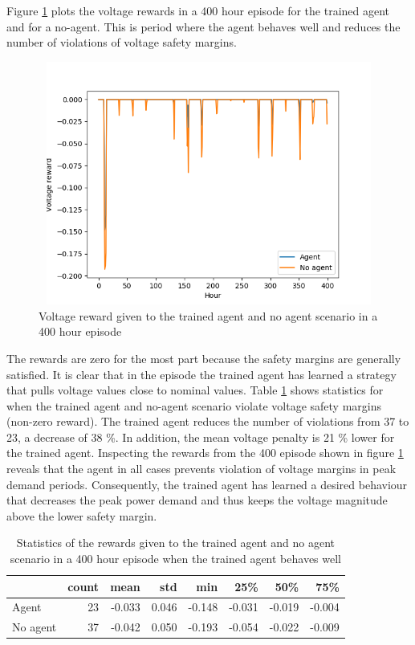 \documentclass[class=book, crop=false]{standalone}
\begin{document}
Figure \ref{fig:results:config1_400hour_good_voltage} plots the voltage rewards in a 400 hour episode for the trained agent and for a no-agent. This is period where the agent behaves well and reduces the number of violations of voltage safety margins. 

\begin{figure}[H]
    \center
\includegraphics[height=8cm, width=12cm]{figures/config1_400hour_good_voltage.png}
    \caption[size = 9]{Voltage reward given to the trained agent and no agent scenario in a 400 hour episode}
    \label{fig:results:config1_400hour_good_voltage}
\end{figure}



The rewards are zero for the most part because the safety margins are generally satisfied. It is clear that in the episode the trained agent has learned a strategy that pulls voltage values close to nominal values. Table \ref{table:results:config1_400hour_good_voltage} shows statistics for when the trained agent and no-agent scenario violate voltage safety margins (non-zero reward). The trained agent reduces the number of violations from 37 to 23, a decrease of 38 \%.  In addition, the mean voltage penalty is 21 \% lower for the trained agent. Inspecting the rewards from the 400 episode shown in figure \ref{fig:results:config1_400hour_good_voltage} reveals that the agent in all cases prevents violation of voltage margins in peak demand periods. Consequently, the trained agent has learned a desired behaviour that decreases the peak power demand and thus keeps the voltage magnitude above the lower safety margin.

\begin{table}[ht]
\center
\begin{tabular}{l|rrrrrrr}
         & count  & mean   & std   & min    & 25\%   & 50\%   & 75\%   \\
\hline
Agent    & 23 & -0.033 & 0.046 & -0.148 & -0.031 & -0.019 & -0.004 \\
No agent & 37 & -0.042 & 0.050 & -0.193 & -0.054 & -0.022 & -0.009 \\
\hline
\end{tabular}
\caption{Statistics of the rewards given to the trained agent and no agent scenario in a 400 hour episode when the trained agent behaves well}
\label{table:results:config1_400hour_good_voltage}
\end{table}
\end{document}
